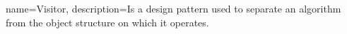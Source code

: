 

\makeglossaries

{
    name=Visitor,
    description={Is a design pattern used to separate an algorithm from the object structure on which it operates.}
}


